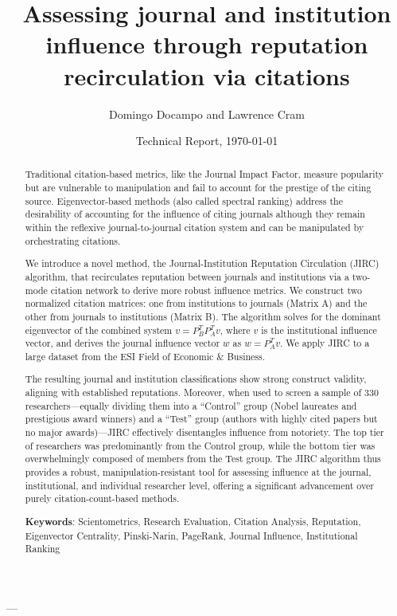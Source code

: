 \documentclass[10pt]{article}
\title{Assessing journal and institution influence through reputation recirculation via citations}
\date{Technical Report, \today}
\author{Domingo Docampo and Lawrence Cram}
\begin{document}
\maketitle

\begin{abstract}

Traditional citation-based metrics, like the Journal Impact Factor, measure popularity but are vulnerable to manipulation and fail to account for the prestige of the citing source. Eigenvector-based methods (also called spectral ranking) address the desirability of accounting for the influence of citing journals although they remain within the reflexive journal-to-journal citation system and can be manipulated by orchestrating citations.

 We introduce a novel method, the Journal-Institution Reputation Circulation (JIRC) algorithm, that recirculates reputation between journals and institutions via a two-mode citation network to derive more robust influence metrics.
We construct two normalized citation matrices: one from institutions to journals (Matrix A) and the other from journals to institutions (Matrix B). The algorithm solves for the dominant eigenvector of the combined system \(v = P_B^T P_A^T v\), where \(v\) is the institutional influence vector, and derives the journal influence vector \(w\) as \(w = P_A^T v\). We apply JIRC to a large dataset from the ESI Field of Economic \& Business.

The resulting journal and institution classifications show strong construct validity, aligning with established reputations. Moreover, when used to screen a sample of 330 researchers—equally dividing them into a ``Control'' group (Nobel laureates and prestigious award winners) and a ``Test'' group (authors with highly cited papers but no major awards)—JIRC effectively disentangles influence from notoriety. The top tier of researchers was predominantly from the Control group, while the bottom tier was overwhelmingly composed of members from the Test group. The JIRC algorithm thus provides a robust, manipulation-resistant tool for assessing influence at the journal, institutional, and individual researcher level, offering a significant advancement over purely citation-count-based methods.

{\bfseries Keywords}: Scientometrics, Research Evaluation, Citation Analysis, Reputation, Eigenvector Centrality, Pinski-Narin, PageRank, Journal Influence, Institutional Ranking
 \end{abstract}
---
\end{document}
